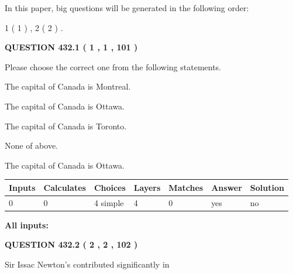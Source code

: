 \documentclass[12pt]{article}
\begin{document}
In this paper, big questions will be generated in the following order: 
   
   
   1 ( 1 )
 ,
   2 ( 2 )
 .
  
\vspace{0.2in}
  
{\textbf{\Large{QUESTION
432.1 
 ( 1 , 1 , 101 )
}}}
  
  
Please choose the correct one from the following statements.
 
 
The capital of Canada is Montreal.
 
 
The capital of Canada is Ottawa.
 
 
The capital of Canada is Toronto.
 
 
 None of above.
 
 
\noindent{}
 
 
The capital of Canada is Ottawa.
 
 
\noindent{}
 
 
   
   
   
   
\noindent\begin{tabular}{|l|l|l|l|l|l|l|}
 \hline
Inputs & Calculates & Choices & Layers & Matches & Answer & Solution \\ \hline
 0  & 
 0  & 
 4
  simple  
  & 
 4  & 
 0  & 
  yes & 
  no 
  \\ \hline
 \end{tabular}
   
   
   
   
\noindent{}
   
   
   
   
\noindent\vspace{0.1in}\hspace{-0.08in} {\textbf{\Large{All inputs: }}}
   
   
  
\vspace{0.2in}
  
{\textbf{\Large{QUESTION
432.2 
 ( 2 , 2 , 102 )
}}}
  
  
Sir Issac Newton's contributed significantly in
 
\end{document}
